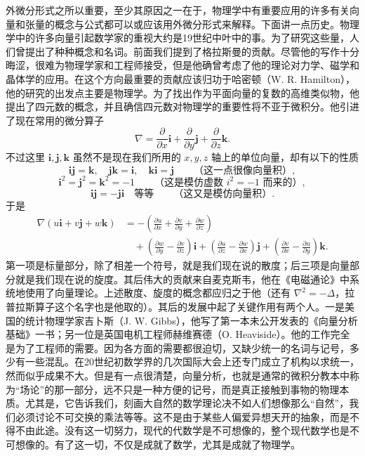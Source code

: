 外微分形式之所以重要，至少其原因之一在于，物理学中有重要应用的许多有关向量和张量的概念与公式都可以或应该用外微分形式来解释。下面讲一点历史。物理学中的许多向量引起数学家的重视大约是19世纪中叶中的事。为了研究这些量，人们曾提出了种种概念和名词。前面我们提到了格拉斯曼的贡献。尽管他的写作十分晦涩，很难为物理学家和工程师接受，但是他确曾考虑了他的理论对力学、磁学和晶体学的应用。在这个方向最重要的贡献应该归功于哈密顿（W. R. Hamilton），他的研究的出发点主要是物理学。为了找出作为平面向量的复数的高维类似物，他提出了四元数的概念，并且确信四元数对物理学的重要性将不亚于微积分。他引进了现在常用的微分算子
\[
 \nabla=\frac{\partial}{\partial x}\mathbf i+\frac{\partial}{\partial y}\mathbf j+\frac{\partial}{\partial z}\mathbf k.
\]
不过这里 $\mathbf i,\mathbf j,\mathbf k$ 虽然不是现在我们所用的 $x,y,z$ 轴上的单位向量，却有以下的性质
\[
 \mathbf i\mathbf j=\mathbf k,\quad \mathbf j\mathbf k=\mathbf i,\quad \mathbf k\mathbf i=\mathbf j
 \qquad\text{（这一点很像向量积）},
\]
\[
 \mathbf i^2=\mathbf j^2=\mathbf k^2=-1
 \qquad\text{（这是模仿虚数 $i^2=-1$ 而来的）},
\]
\[
 \mathbf i\mathbf j=-\mathbf j\mathbf i\quad\text{等等}
 \qquad\text{（这又是模仿向量积）}.
\]
于是
\begin{align*}
 \nabla(u\mathbf i+v\mathbf j+w\mathbf k)
 &=-\left(\frac{\partial u}{\partial x}+\frac{\partial v}{\partial y}+\frac{\partial w}{\partial z}\right)\\
 &\quad+\left(\frac{\partial w}{\partial y}-\frac{\partial v}{\partial z}\right)\mathbf i
 +\left(\frac{\partial u}{\partial z}-\frac{\partial w}{\partial x}\right)\mathbf j
 +\left(\frac{\partial v}{\partial x}-\frac{\partial u}{\partial y}\right)\mathbf k.
\end{align*}
第一项是标量部分，除了相差一个符号，就是我们现在说的散度；后三项是向量部分就是我们现在说的旋度。其后伟大的贡献来自麦克斯韦，他在《电磁通论》中系统地使用了向量理论。上述散度、旋度的概念都应归之于他（还有 $\nabla^2=-\Delta$，拉普拉斯算子这个名字也是他取的）。其后的发展中起了关键作用有两个人。一是美国的统计物理学家吉卜斯（J. W. Gibbs），他写了第一本未公开发表的《向量分析基础》一书；另一位是英国电机工程师赫维赛德（O. Heaviside）。他的工作完全是为了工程师的需要。因为各方面的需要都很迫切，又缺少统一的名词与记号，多少有一些混乱。在20世纪初数学界的几次国际大会上还专门成立了机构以求统一，然而似乎成果不大。但是有一点很清楚，向量分析，也就是通常的微积分教本中称为“场论”的那一部分，远不只是一种方便的记号，而是真正接触到事物的物理本质。尤其是，它告诉我们，刻画大自然的数学理论决不如人们想像那么“自然”，我们必须讨论不可交换的乘法等等。这不是由于某些人偏爱异想天开的抽象，而是不得不由此途。没有这一切努力，现代的代数学是不可想像的，整个现代数学也是不可想像的。有了这一切，不仅是成就了数学，尤其是成就了物理学。

